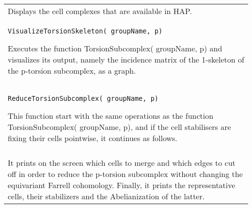 \documentclass[a4paper,11pt]{report}
\begin{document}
{\begin{center}
\begin{tabular}{|l|}
 Displays the cell complexes that are available in HAP. \\
 \index{VisualizeTorsionSkeleton} \texttt{VisualizeTorsionSkeleton( groupName, p)} 

 Executes the function TorsionSubcomplex( groupName, p) and visualizes its
output, namely the incidence matrix of the 1-skeleton of the p-torsion
subcomplex, as a graph. \\
 \index{ReduceTorsionSubcomplex} \texttt{ReduceTorsionSubcomplex( groupName, p)} 

 This function start with the same operations as the function
TorsionSubcomplex( groupName, p), and if the cell stabilisers are fixing their
cells pointwise, it continues as follows. \\
\\
 It prints on the screen which cells to merge and which edges to cut off in
order to reduce the p-torsion subcomplex without changing the equivariant
Farrell cohomology. Finally, it prints the representative cells, their
stabilizers and the Abelianization of the latter. \\
\end{tabular}\\[2mm]
\end{center}

 }

 
\end{document}
